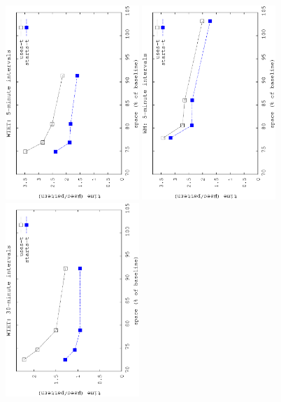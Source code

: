 	\begin{figure}[!ht]
		\begin{center}
			\begin{center}
				{\includegraphics[angle=-90,width=0.45\textwidth]{figures_synt/madrid_t5mht.eps}}
				{\includegraphics[angle=-90,width=0.45\textwidth]{figures_synt/madrid_t5mwm.eps}}
				{\includegraphics[angle=-90,width=0.45\textwidth]{figures_synt/madrid_t30mht.eps}}

\end{center}
\end{center}
\end{figure}
